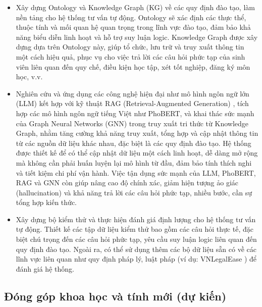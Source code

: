\documentclass[a4paper,12pt]{article}
\begin{document}
\begin{itemize}
    \item Xây dựng Ontology và Knowledge Graph (KG) về các quy định đào tạo, làm nền tảng cho hệ thống tư vấn tự động. Ontology sẽ xác định các thực thể, thuộc tính và mối quan hệ quan trọng trong lĩnh vực đào tạo, đảm bảo khả năng biểu diễn linh hoạt và hỗ trợ suy luận logic. Knowledge Graph được xây dựng dựa trên Ontology này, giúp tổ chức, lưu trữ và truy xuất thông tin một cách hiệu quả, phục vụ cho việc trả lời các câu hỏi phức tạp của sinh viên liên quan đến quy chế, điều kiện học tập, xét tốt nghiệp, đăng ký môn học, v.v.

    \item Nghiên cứu và ứng dụng các công nghệ hiện đại như mô hình ngôn ngữ lớn (LLM) kết hợp với kỹ thuật RAG (Retrieval-Augmented Generation) \cite{RAG}, tích hợp các mô hình ngôn ngữ tiếng Việt như PhoBERT, và khai thác sức mạnh của Graph Neural Networks (GNN) trong truy xuất tri thức từ Knowledge Graph, nhằm tăng cường khả năng truy xuất, tổng hợp và cập nhật thông tin từ các nguồn dữ liệu khác nhau, đặc biệt là các quy định đào tạo. Hệ thống được thiết kế để có thể cập nhật dữ liệu một cách linh hoạt, dễ dàng mở rộng mà không cần phải huấn luyện lại mô hình từ đầu, đảm bảo tính thích nghi và tiết kiệm chi phí vận hành. Việc tận dụng sức mạnh của LLM, PhoBERT, RAG và GNN còn giúp nâng cao độ chính xác, giảm hiện tượng ảo giác (hallucination) và khả năng trả lời các câu hỏi phức tạp, nhiều bước, cần sự tổng hợp kiến thức.

    \item Xây dựng bộ kiểm thử và thực hiện đánh giá định lượng cho hệ thống tư vấn tự động. Thiết kế các tập dữ liệu kiểm thử bao gồm các câu hỏi thực tế, đặc biệt chú trọng đến các câu hỏi phức tạp, yêu cầu suy luận logic liên quan đến quy định đào tạo. Ngoài ra, có thể sử dụng thêm các bộ dữ liệu sẵn có về các lĩnh vực liên quan như quy định pháp lý, luật pháp (ví dụ: VNLegalEase \cite{VNLegalEase}) để đánh giá hệ thống.
\end{itemize}

\subsection{Đóng góp khoa học và tính mới (dự kiến)}
\end{document}
